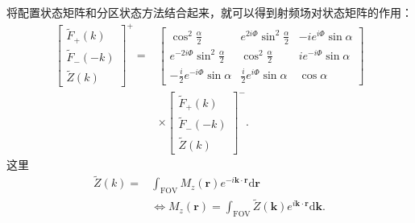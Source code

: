将配置状态矩阵和分区状态方法结合起来，就可以得到射频场对状态矩阵的作用：
 \begin{align}
 \left[
  \begin{matrix}
   \tilde{F}_+(k) \\
   \tilde{F}_-(-k) \\
   \tilde{Z}(k)
   \end{matrix}
   \right]^+
   =&
   \left[
  \begin{matrix}
   \cos^2\frac{\alpha}{2} & e^{2i\Phi}\sin^2\frac{\alpha}{2} & -ie^{i\Phi}\sin\alpha \\
   e^{-2i\Phi}\sin^2\frac{\alpha}{2} & \cos^2\frac{\alpha}{2} & ie^{-i\Phi}\sin\alpha \\
   -\frac{i}{2}e^{-i\Phi}\sin\alpha & \frac{i}{2}e^{i\Phi}\sin\alpha & \cos\alpha
   \end{matrix}
   \right]\nonumber \\
   & \times \left[
  \begin{matrix}
   \tilde{F}_+(k) \\
   \tilde{F}_-(-k) \\
   \tilde{Z}(k)
   \end{matrix}
   \right]^-.
 \end{align}
 这里
 \begin{align} 
 \tilde{Z}(k)=&\int_{\mathrm{FOV}}M_z(\textbf{r})e^{-i\textbf{k} \cdot \textbf{r}}\mathrm{d}\textbf{r}\nonumber\\ &\Longleftrightarrow
 M_z(\textbf{r})=\int_{\mathrm{FOV}}\tilde{Z}(\textbf{k})e^{i\textbf{k} \cdot \textbf{r}}\mathrm{d}\textbf{k}.
 \end{align}
 
